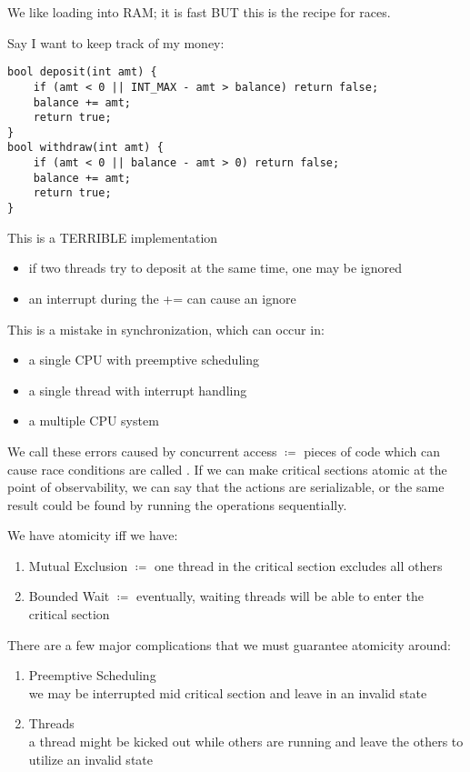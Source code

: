 \documentclass[../../lecture_notes.tex]{subfiles}
\begin{document}
We like loading into RAM; it is fast BUT this is the recipe for races.

Say I want to keep track of my money:
\begin{lstlisting}
bool deposit(int amt) {
	if (amt < 0 || INT_MAX - amt > balance) return false;
	balance += amt;
	return true;
}
bool withdraw(int amt) {
	if (amt < 0 || balance - amt > 0) return false;
	balance += amt;
	return true;
}
\end{lstlisting}


This is a TERRIBLE implementation
\begin{itemize}[nosep]
\item if two threads try to deposit at the same time, one may be ignored
\item an interrupt during the += can cause an ignore
\end{itemize}


This is a mistake in synchronization, which can occur in:
\begin{itemize}
\item a single CPU with preemptive scheduling
\item a single thread with interrupt handling
\item a multiple CPU system
\end{itemize}

We call these errors caused by concurrent access  $\coloneqq$ pieces of code which can cause race conditions are called . If we can make critical sections atomic at the point of observability, we can say that the actions are serializable, or the same result could be found by running the operations sequentially.

We have atomicity iff we have:
\begin{enumerate}[label=(\roman*)]
\item Mutual Exclusion $\coloneqq$ one thread in the critical section excludes all others
\item Bounded Wait $\coloneqq$ eventually, waiting threads will be able to enter the critical section
\end{enumerate}


There are a few major complications that we must guarantee atomicity around:
\begin{enumerate}[label=(\roman*)]
\item Preemptive Scheduling \\
	we may be interrupted mid critical section and leave in an invalid state
\item Threads \\
	a thread might be kicked out while others are running and leave the others to utilize an invalid state
\end{enumerate}
\end{document}
